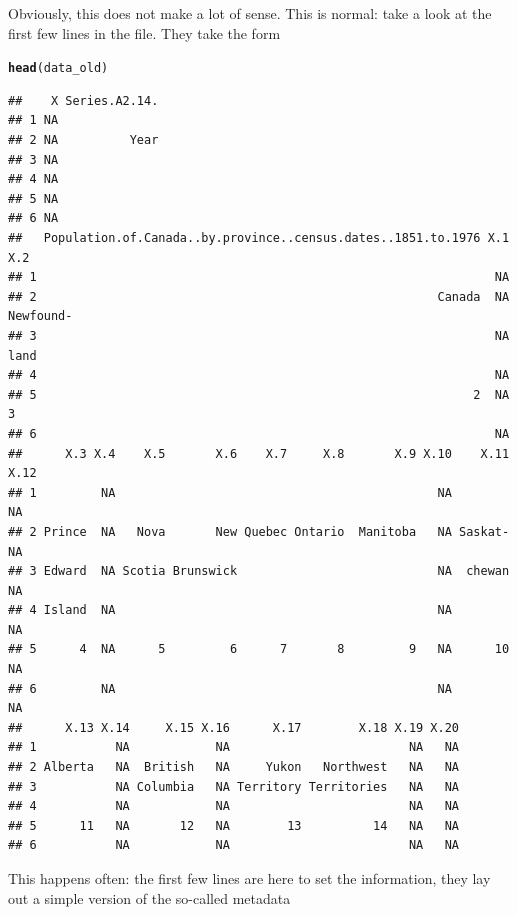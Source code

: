 \documentclass[aspectratio=169]{beamer}\usepackage[]{graphicx}\usepackage[]{xcolor}
\makeatletter
\newcommand{\hlstd}[1]{\textcolor[rgb]{0.345,0.345,0.345}{#1}}%
\newcommand{\hlkwd}[1]{\textcolor[rgb]{0.737,0.353,0.396}{\textbf{#1}}}%
\newenvironment{kframe}{%
 \def\at@end@of@kframe{}%
 \ifinner\ifhmode%
  \def\at@end@of@kframe{\end{minipage}}%
  \begin{minipage}{\columnwidth}%
 \fi\fi%
 \def\FrameCommand##1{\hskip\@totalleftmargin \hskip-\fboxsep
 \colorbox{shadecolor}{##1}\hskip-\fboxsep
     \hskip-\linewidth \hskip-\@totalleftmargin \hskip\columnwidth}%
 \MakeFramed {\advance\hsize-\width
   \@totalleftmargin\z@ \linewidth\hsize
   \@setminipage}}%
 {\par\unskip\endMakeFramed%
 \at@end@of@kframe}
\newenvironment{knitrout}{}{} %
\makeatother
\begin{document}
\begin{frame}[fragile]
Obviously, this does not make a lot of sense. This is normal: take a look at the first few lines in the file. They take the form
\begin{knitrout}
\color{fgcolor}\begin{kframe}
\begin{alltt}
\hlkwd{head}\hlstd{(data_old)}
\end{alltt}
\begin{verbatim}
##    X Series.A2.14.
## 1 NA              
## 2 NA          Year
## 3 NA              
## 4 NA              
## 5 NA              
## 6 NA              
##   Population.of.Canada..by.province..census.dates..1851.to.1976 X.1       X.2
## 1                                                                NA          
## 2                                                        Canada  NA Newfound-
## 3                                                                NA      land
## 4                                                                NA          
## 5                                                             2  NA         3
## 6                                                                NA          
##      X.3 X.4    X.5       X.6    X.7     X.8       X.9 X.10    X.11 X.12
## 1         NA                                             NA           NA
## 2 Prince  NA   Nova       New Quebec Ontario  Manitoba   NA Saskat-   NA
## 3 Edward  NA Scotia Brunswick                            NA  chewan   NA
## 4 Island  NA                                             NA           NA
## 5      4  NA      5         6      7       8         9   NA      10   NA
## 6         NA                                             NA           NA
##      X.13 X.14     X.15 X.16      X.17        X.18 X.19 X.20
## 1           NA            NA                         NA   NA
## 2 Alberta   NA  British   NA     Yukon   Northwest   NA   NA
## 3           NA Columbia   NA Territory Territories   NA   NA
## 4           NA            NA                         NA   NA
## 5      11   NA       12   NA        13          14   NA   NA
## 6           NA            NA                         NA   NA
\end{verbatim}
\end{kframe}
\end{knitrout}
\vfill
This happens often: the first few lines are here to set the information, they lay out a simple version of the so-called metadata
\end{frame}
\end{document}
